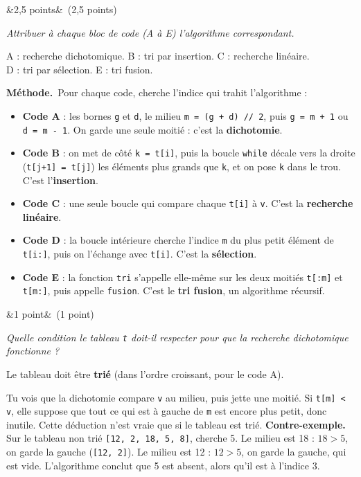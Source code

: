 \documentclass[11pt, a4paper]{exam}
\newcommand{\code}[1]{\texttt{#1}}
\newcommand{\Q}[3]{\par\needspace{5\baselineskip}\bigskip\noindent{\large\bfseries Question #1}\ifx&#2&\else\ \textnormal{(#2)}\fi\par\nopagebreak\smallskip\noindent\textit{#3}\par\nopagebreak\smallskip}
\newcommand{\methode}{\par\noindent\textbf{Méthode.}\ }
\begin{document}
\Q{4}{2,5 points}{Attribuer à chaque bloc de code (A à E) l'algorithme correspondant.}
\begin{reponse}
A : recherche dichotomique. \quad B : tri par insertion. \quad C : recherche linéaire. \\
D : tri par sélection. \quad E : tri fusion.
\end{reponse}
\methode Pour chaque code, cherche l'indice qui trahit l'algorithme :
\begin{itemize}
\item \textbf{Code A} : les bornes \code{g} et \code{d}, le milieu \code{m = (g + d) // 2}, puis \code{g = m + 1} ou \code{d = m - 1}. On garde une seule moitié : c'est la \textbf{dichotomie}.
\item \textbf{Code B} : on met de côté \code{k = t[i]}, puis la boucle \code{while} décale vers la droite (\code{t[j+1] = t[j]}) les éléments plus grands que \code{k}, et on pose \code{k} dans le trou. C'est l'\textbf{insertion}.
\item \textbf{Code C} : une seule boucle qui compare chaque \code{t[i]} à \code{v}. C'est la \textbf{recherche linéaire}.
\item \textbf{Code D} : la boucle intérieure cherche l'indice \code{m} du plus petit élément de \code{t[i:]}, puis on l'échange avec \code{t[i]}. C'est la \textbf{sélection}.
\item \textbf{Code E} : la fonction \code{tri} s'appelle elle-même sur les deux moitiés \code{t[:m]} et \code{t[m:]}, puis appelle \code{fusion}. C'est le \textbf{tri fusion}, un algorithme récursif.
\end{itemize}

\Q{5 (a)}{1 point}{Quelle condition le tableau \code{t} doit-il respecter pour que la recherche dichotomique fonctionne ?}
\begin{reponse}
Le tableau doit être \textbf{trié} (dans l'ordre croissant, pour le code A).
\end{reponse}
Tu vois que la dichotomie compare \code{v} au milieu, puis jette une moitié. Si \code{t[m] < v}, elle suppose que tout ce qui est à gauche de \code{m} est encore plus petit, donc inutile. Cette déduction n'est vraie que si le tableau est trié. \textbf{Contre-exemple.} Sur le tableau non trié \code{[12, 2, 18, 5, 8]}, cherche 5. Le milieu est 18 : $18 > 5$, on garde la gauche (\code{[12, 2]}). Le milieu est 12 : $12 > 5$, on garde la gauche, qui est vide. L'algorithme conclut que 5 est absent, alors qu'il est à l'indice 3.
\end{document}

